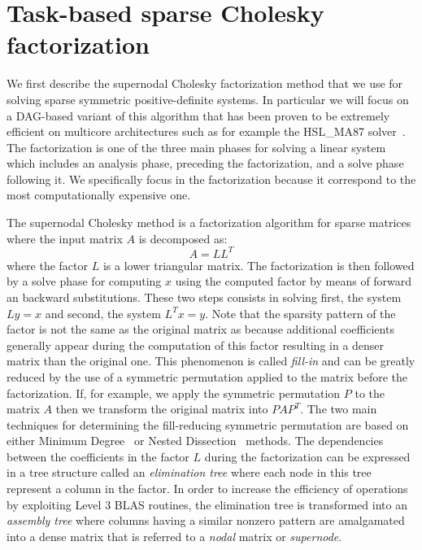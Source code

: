 \documentclass{article}
\newcommand{\ma}{HSL\_MA87\xspace}
\begin{document}


\section{Task-based sparse Cholesky factorization}\label{sec:chol}
\setcounter{equation}{0}
\setcounter{table}{0}
\setcounter{figure}{0}

We first describe the supernodal Cholesky factorization method that we
use for solving sparse symmetric positive-definite systems. In
particular we will focus on a DAG-based variant of this algorithm that
has been proven to be extremely efficient on multicore architectures
such as for example the \ma solver~\cite{h.r.s:10}. The factorization
is one of the three main phases for solving a linear system which
includes an analysis phase, preceding the factorization, and a solve
phase following it. We specifically focus in the factorization because
it correspond to the most computationally expensive one.

The supernodal Cholesky method is a factorization algorithm for sparse
matrices where the input matrix $A$ is decomposed as:
\begin{equation}\label{eq:chol}
  A = LL^{T}
\end{equation}
where the factor $L$ is a lower triangular matrix. The factorization
is then followed by a solve phase for computing $x$ using the computed
factor by means of forward an backward substitutions. These two steps
consists in solving first, the system $Ly=x$ and second, the system
$L^{T}x=y$. Note that the sparsity pattern of the factor is not the
same as the original matrix as because additional coefficients
generally appear during the computation of this factor resulting in a
denser matrix than the original one. This phenomenon is called
\textit{fill-in} and can be greatly reduced by the use of a symmetric
permutation applied to the matrix before the factorization. If, for
example, we apply the symmetric permutation $P$ to the matrix $A$ then
we transform the original matrix into $PAP^{T}$. The two main
techniques for determining the fill-reducing symmetric permutation are
based on either Minimum Degree~\cite{t.w:67, l:85, a.d.d:96, a.d.d:04}
or Nested Dissection~\cite{g.l:78} methods. The dependencies between
the coefficients in the factor $L$ during the factorization can be
expressed in a tree structure called an \textit{elimination tree}
where each node in this tree represent a column in the factor. In
order to increase the efficiency of operations by exploiting Level 3
BLAS routines, the elimination tree is transformed into an
\textit{assembly tree} where columns having a similar nonzero pattern
are amalgamated into a dense matrix that is referred to a
\textit{nodal} matrix or \textit{supernode}. 
\end{document}
